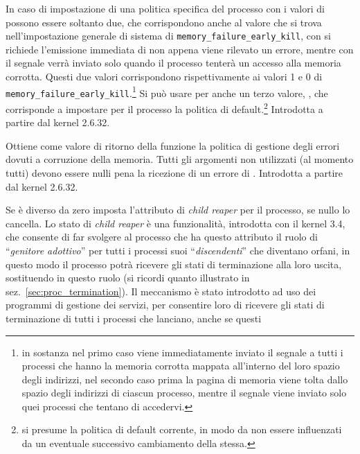 \begin{basedescript}{\desclabelwidth{1.5cm}\desclabelstyle{\nextlinelabel}}
  In caso di impostazione di una politica specifica del processo con
   i valori di  possono essere soltanto
  due, che corrispondono anche al valore che si trova nell'impostazione
  generale di sistema di \texttt{memory\_failure\_early\_kill}, con
   si richiede l'emissione immediata di
   non appena viene rilevato un errore, mentre con
   il segnale verrà inviato solo quando il processo
  tenterà un accesso alla memoria corrotta. Questi due valori corrispondono
  rispettivamente ai valori 1 e 0 di
  \texttt{memory\_failure\_early\_kill}.\footnote{in sostanza nel primo caso
    viene immediatamente inviato il segnale a tutti i processi che hanno la
    memoria corrotta mappata all'interno del loro spazio degli indirizzi, nel
    secondo caso prima la pagina di memoria viene tolta dallo spazio degli
    indirizzi di ciascun processo, mentre il segnale viene inviato solo quei
    processi che tentano di accedervi.} Si può usare per  anche un
  terzo valore, , che corrisponde a impostare
  per il processo la politica di default.\footnote{si presume la politica di
    default corrente, in modo da non essere influenzati da un eventuale
    successivo cambiamento della stessa.} Introdotta a partire dal kernel
  2.6.32.
\item[\constd{PR\_MCE\_KILL\_GET}] Ottiene come valore di ritorno della
  funzione la politica di gestione degli errori dovuti a corruzione della
  memoria. Tutti gli argomenti non utilizzati (al momento tutti) devono essere
  nulli pena la ricezione di un errore di . Introdotta a
  partire dal kernel 2.6.32.
\item[\constd{PR\_SET\_CHILD\_SUBREAPER}] Se  è diverso da zero
  imposta l'attributo di \textit{child reaper} per il processo, se nullo lo
  cancella. Lo stato di \textit{child reaper} è una funzionalità, introdotta
  con il kernel 3.4, che consente di far svolgere al processo che ha questo
  attributo il ruolo di ``\textsl{genitore adottivo}'' per tutti i processi
  suoi ``\textsl{discendenti}'' che diventano orfani, in questo modo il
  processo potrà ricevere gli stati di terminazione alla loro uscita,
  sostituendo in questo ruolo  (si ricordi quanto illustrato in
  sez.~\ref{sec:proc_termination}). Il meccanismo è stato introdotto ad uso
  dei programmi di gestione dei servizi, per consentire loro di ricevere gli
  stati di terminazione di tutti i processi che lanciano, anche se questi

\end{basedescript}

